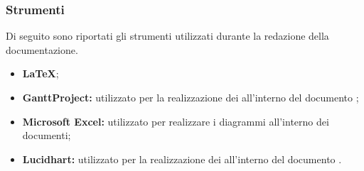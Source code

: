 \subsubsection{Strumenti} \label{Documentazione_Strumenti}
Di seguito sono riportati gli strumenti utilizzati durante la redazione della documentazione.
\begin{itemize}
	\item \textbf{\LaTeX};
	\item \textbf{GanttProject:} utilizzato per la realizzazione dei  all'interno del documento ;
	\item \textbf{Microsoft Excel:} utilizzato per realizzare i diagrammi all'interno dei documenti;
	\item \textbf{Lucidhart:} utilizzato per la realizzazione dei  all'interno del documento .
\end{itemize}